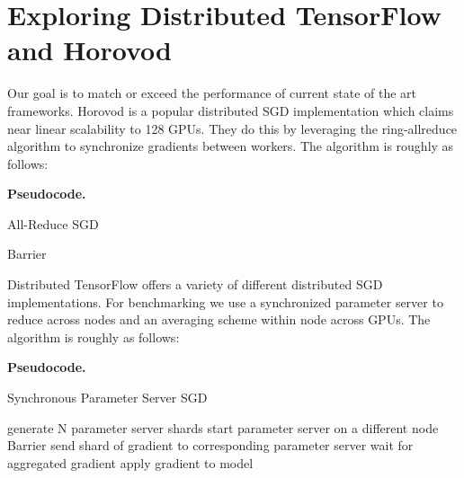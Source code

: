 \section{Exploring Distributed TensorFlow and Horovod}

Our goal is to match or exceed the performance of current state of the art frameworks. Horovod is a popular distributed SGD implementation which claims near linear scalability to 128 GPUs. They do this by leveraging the ring-allreduce algorithm to synchronize gradients between workers. The algorithm is roughly as follows:

\textbf{Pseudocode.}
\begin{algorithm}
\caption{All-Reduce SGD}
 {
}
Barrier\;

 {
}


 {
}
\end{algorithm}
\clearpage

Distributed TensorFlow offers a variety of different distributed SGD implementations. For benchmarking we use a synchronized parameter server to reduce across nodes and an averaging scheme within node across GPUs. The algorithm is roughly as follows:

\textbf{Pseudocode.}
\begin{algorithm}
\caption{Synchronous Parameter Server SGD}
 {
}
generate N parameter server shards\;
 {
    start parameter server on a different node \;
}
Barrier\;
 {
send shard of gradient to corresponding parameter server \;
wait for aggregated gradient \;
apply gradient to model \;
}
\end{algorithm}

